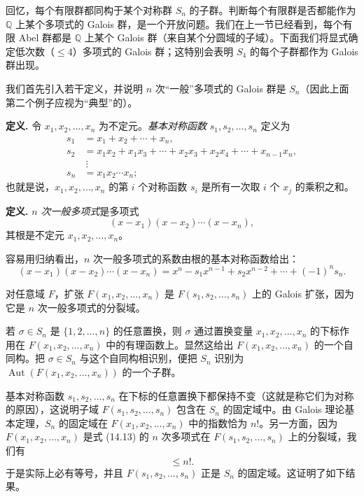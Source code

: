 回忆，每个有限群都同构于某个对称群 $S_n$ 的子群。判断每个有限群是否都能作为 $\mathbb Q$ 上某个多项式的 Galois 群，是一个开放问题。我们在上一节已经看到，每个有限 Abel 群都是 $\mathbb Q$ 上某个 Galois 群（来自某个分圆域的子域）。下面我们将显式确定低次数（$\leq 4$）多项式的 Galois 群；这特别会表明 $S_4$ 的每个子群都作为 Galois 群出现。

我们首先引入若干定义，并说明 $n$ 次“一般”多项式的 Galois 群是 $S_n$（因此上面第二个例子应视为“典型”的）。

\noindent\textbf{定义.} 令 $x_1,x_2,\ldots,x_n$ 为不定元。\emph{基本对称函数} $s_1,s_2,\ldots,s_n$ 定义为
\[
\begin{aligned}
s_1&=x_1+x_2+\cdots+x_n,\\
s_2&=x_1x_2+x_1x_3+\cdots+x_2x_3+x_2x_4+\cdots+x_{n-1}x_n,\\
&\ \vdots\\
s_n&=x_1x_2\cdots x_n;
\end{aligned}
\]
也就是说，$x_1,x_2,\ldots,x_n$ 的第 $i$ 个对称函数 $s_i$ 是所有一次取 $i$ 个 $x_j$ 的乘积之和。

\noindent\textbf{定义.} \emph{$n$ 次一般多项式}是多项式
\[
(x-x_1)(x-x_2)\cdots(x-x_n),
\]
其根是不定元 $x_1,x_2,\ldots,x_n$。

容易用归纳看出，$n$ 次一般多项式的系数由根的基本对称函数给出：
\begin{equation}
(x-x_1)(x-x_2)\cdots(x-x_n)=x^n-s_1x^{n-1}+s_2x^{n-2}+\cdots+(-1)^n s_n.\tag{14.13}
\end{equation}

对任意域 $F$，扩张 $F(x_1,x_2,\ldots,x_n)$ 是 $F(s_1,s_2,\ldots,s_n)$ 上的 Galois 扩张，因为它是 $n$ 次一般多项式的分裂域。

若 $\sigma\in S_n$ 是 $\{1,2,\ldots,n\}$ 的任意置换，则 $\sigma$ 通过置换变量 $x_1,x_2,\ldots,x_n$ 的下标作用在 $F(x_1,x_2,\ldots,x_n)$ 中的有理函数上。显然这给出 $F(x_1,x_2,\ldots,x_n)$ 的一个自同构。把 $\sigma\in S_n$ 与这个自同构相识别，便把 $S_n$ 识别为 $\operatorname{Aut}(F(x_1,x_2,\ldots,x_n))$ 的一个子群。

基本对称函数 $s_1,s_2,\ldots,s_n$ 在下标的任意置换下都保持不变（这就是称它们为对称的原因），这说明子域 $F(s_1,s_2,\ldots,s_n)$ 包含在 $S_n$ 的固定域中。由 Galois 理论基本定理，$S_n$ 的固定域在 $F(x_1,x_2,\ldots,x_n)$ 中的指数恰为 $n!$。另一方面，因为 $F(x_1,x_2,\ldots,x_n)$ 是式 (14.13) 的 $n$ 次多项式在 $F(s_1,s_2,\ldots,s_n)$ 上的分裂域，我们有
\begin{equation}
[F(x_1,x_2,\ldots,x_n):F(s_1,s_2,\ldots,s_n)]\leq n!.\tag{14.14}
\end{equation}
于是实际上必有等号，并且 $F(s_1,s_2,\ldots,s_n)$ 正是 $S_n$ 的固定域。这证明了如下结果。

